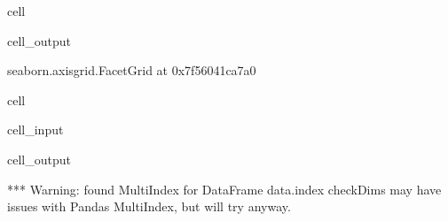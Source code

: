 \documentclass[letterpaper,table,10pt,english]{jupyterBook}
\begin{document}
\begin{sphinxuseclass}{cell}
\begin{sphinxVerbatimOutput}
\begin{sphinxuseclass}{cell_output}
\begin{sphinxVerbatim}[commandchars=\\\{\}]
\PYGZlt{}seaborn.axisgrid.FacetGrid at 0x7f56041ca7a0\PYGZgt{}
\end{sphinxVerbatim}

\noindent{}

\end{sphinxuseclass}\end{sphinxVerbatimOutput}

\end{sphinxuseclass}
\begin{sphinxuseclass}{cell}\begin{sphinxVerbatimInput}

\begin{sphinxuseclass}{cell_input}
\begin{sphinxVerbatim}[commandchars=\\\{\}]
   
       
                      
\end{sphinxVerbatim}

\end{sphinxuseclass}\end{sphinxVerbatimInput}
\begin{sphinxVerbatimOutput}

\begin{sphinxuseclass}{cell_output}
\begin{sphinxVerbatim}[commandchars=\\\{\}]
*** Warning: found MultiIndex for DataFrame data.index \PYGZhy{} checkDims may have issues with Pandas MultiIndex, but will try anyway.
\end{sphinxVerbatim}


\end{sphinxuseclass}
\end{sphinxVerbatimOutput}
\end{sphinxuseclass}
\end{document}
